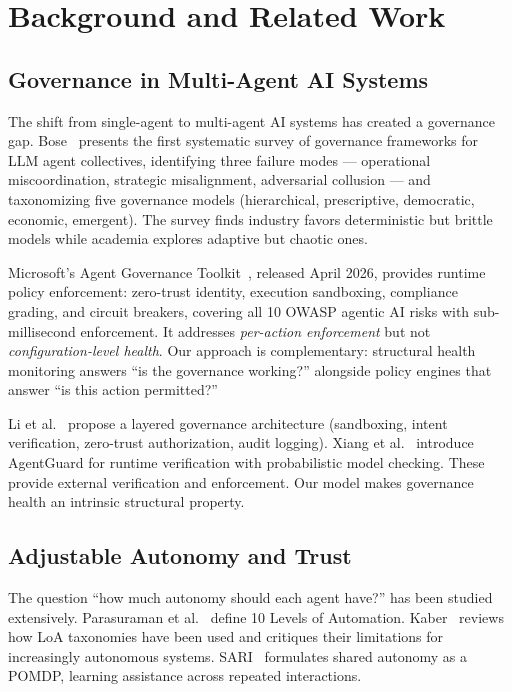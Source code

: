 \documentclass[sigconf,nonacm]{acmart}
\begin{document}
\section{Background and Related Work}

\subsection{Governance in Multi-Agent AI Systems}

The shift from single-agent to multi-agent AI systems has created a
governance gap. Bose~\cite{bose} presents the first systematic survey of
governance frameworks for LLM agent collectives, identifying three
failure modes --- operational miscoordination, strategic misalignment,
adversarial collusion --- and taxonomizing five governance models
(hierarchical, prescriptive, democratic, economic, emergent). The
survey finds industry favors deterministic but brittle models while
academia explores adaptive but chaotic ones.

Microsoft's Agent Governance Toolkit~\cite{microsoft}, released April
2026, provides runtime policy enforcement: zero-trust identity, execution
sandboxing, compliance grading, and circuit breakers, covering all 10
OWASP agentic AI risks with sub-millisecond enforcement. It addresses
\emph{per-action enforcement} but not \emph{configuration-level health}.
Our approach is complementary: structural health monitoring answers ``is
the governance working?'' alongside policy engines that answer ``is this
action permitted?''

Li et al.~\cite{liarch} propose a layered governance architecture
(sandboxing, intent verification, zero-trust authorization, audit
logging). Xiang et al.~\cite{agentguard} introduce AgentGuard for
runtime verification with probabilistic model checking. These provide
external verification and enforcement. Our model makes governance health
an intrinsic structural property.

\subsection{Adjustable Autonomy and Trust}

The question ``how much autonomy should each agent have?'' has been
studied extensively. Parasuraman et al.~\cite{parasuraman} define 10
Levels of Automation. Kaber~\cite{kaber} reviews how LoA taxonomies have
been used and critiques their limitations for increasingly autonomous
systems. SARI~\cite{sari} formulates shared autonomy as a POMDP, learning
assistance across repeated interactions.
\end{document}
